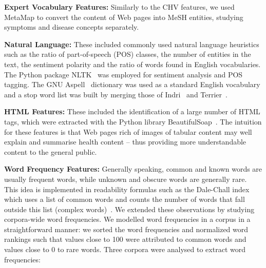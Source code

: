 \textbf{Expert Vocabulary Features:}
Similarly to the CHV features, we used MetaMap to convert the content of Web pages into MeSH entities, studying symptoms and disease concepts separately. 



\textbf{Natural Language:}
These included commonly used natural language heuristics such as the ratio of part-of-speech (POS) classes, the number of entities in the text, the sentiment polarity and the ratio of words found in English vocabularies. The Python package NLTK~\cite{nltk} was employed for sentiment analysis and POS tagging. The GNU Aspell~\cite{aspell} dictionary was used as a standard English vocabulary and a stop word list was built by merging those of Indri~\cite{indri} and Terrier~\cite{terrier}. 



\textbf{HTML Features:}
These included the identification of a large number of HTML tags, which were extracted with the Python library BeautifulSoap~\cite{bs4}. The intuition for these features is that Web pages rich of images of tabular content may well explain and summarise health content -- thus providing more understandable content to the general public. 


\textbf{Word Frequency Features:}
Generally speaking, common and known words are usually frequent words, while unknown and obscure words are generally rare. This idea is implemented in readability formulas such as the Dale-Chall index which uses a list of common words and counts the number of words that fall outside this list (complex words)~\cite{dale48}.
We extended these observations by studying corpora-wide word frequencies. 
We modelled word frequencies in a corpus in a straightforward manner: we sorted the word frequencies and normalized word rankings such that values close to 100 were attributed to common words and values close to 0 to rare words. Three corpora were analysed to extract word frequencies:


